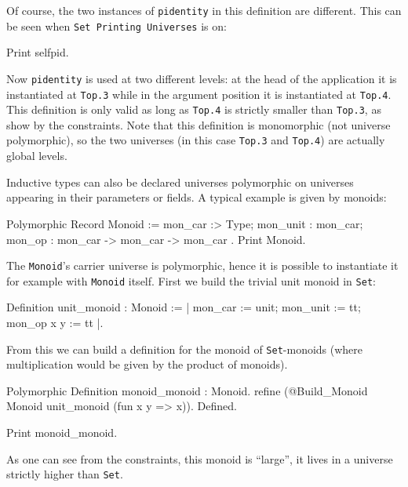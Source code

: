 Of course, the two instances of \texttt{pidentity} in this definition
are different. This can be seen when \texttt{Set Printing Universes} is
on:

\begin{coq_example}
Print selfpid.
\end{coq_example}

Now \texttt{pidentity} is used at two different levels: at the head of
the application it is instantiated at \texttt{Top.3} while in the
argument position it is instantiated at \texttt{Top.4}. This definition
is only valid as long as \texttt{Top.4} is strictly smaller than
\texttt{Top.3}, as show by the constraints. Note that this definition is
monomorphic (not universe polymorphic), so the two universes
(in this case \texttt{Top.3} and \texttt{Top.4}) are actually global levels.

Inductive types can also be declared universes polymorphic on universes
appearing in their parameters or fields. A typical example is given by
monoids:

\begin{coq_example}
Polymorphic Record Monoid := { mon_car :> Type; mon_unit : mon_car; 
  mon_op : mon_car -> mon_car -> mon_car }.
Print Monoid.
\end{coq_example}

The \texttt{Monoid}'s carrier universe is polymorphic, hence it is
possible to instantiate it for example with \texttt{Monoid} itself.
First we build the trivial unit monoid in \texttt{Set}:
\begin{coq_example}
Definition unit_monoid : Monoid := 
  {| mon_car := unit; mon_unit := tt; mon_op x y := tt |}.
\end{coq_example} 

From this we can build a definition for the monoid of
\texttt{Set}-monoids (where multiplication would be given by the product
of monoids).

\begin{coq_example*}
Polymorphic Definition monoid_monoid : Monoid.
  refine (@Build_Monoid Monoid unit_monoid (fun x y => x)).
Defined.
\end{coq_example*}
\begin{coq_example}
Print monoid_monoid.
\end{coq_example} 

As one can see from the constraints, this monoid is ``large'', it lives
in a universe strictly higher than \texttt{Set}.


